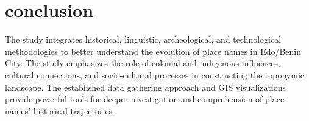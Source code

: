 \section{conclusion}
The study integrates historical, linguistic, archeological, and technological methodologies to better understand the evolution of place names in Edo/Benin City. The study emphasizes the role of colonial and indigenous influences, cultural connections, and socio-cultural processes in constructing the toponymic landscape. The established data gathering approach and GIS visualizations provide powerful tools for deeper investigation and comprehension of place names' historical trajectories.